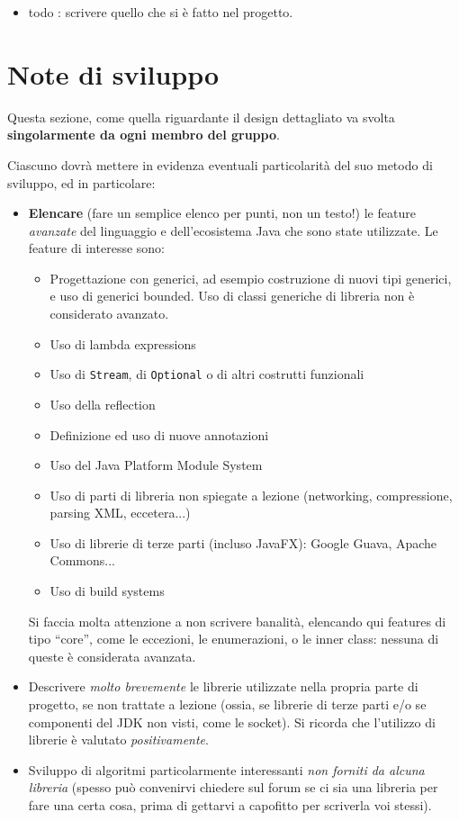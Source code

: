 \begin{itemize}
	\item  todo : scrivere quello che si è fatto nel progetto.
\end{itemize}

\section{Note di sviluppo}

Questa sezione, come quella riguardante il design dettagliato va svolta \textbf{singolarmente da ogni membro del gruppo}.

Ciascuno dovrà mettere in evidenza eventuali particolarità del suo metodo di sviluppo, ed in particolare:
\begin{itemize}
	\item \textbf{Elencare} (fare un semplice elenco per punti, non un testo!) le feature \textit{avanzate} del linguaggio e dell'ecosistema Java che sono state
	utilizzate. Le feature di interesse sono:
	\begin{itemize}
		\item Progettazione con generici, ad esempio costruzione di nuovi tipi generici, e uso di generici bounded. Uso di classi generiche di libreria non è considerato avanzato.
		\item Uso di lambda expressions
		\item Uso di \texttt{Stream}, di \texttt{Optional} o di altri costrutti funzionali
		\item Uso della reflection
		\item Definizione ed uso di nuove annotazioni
		\item Uso del Java Platform Module System
		\item Uso di parti di libreria non spiegate a lezione (networking, compressione, parsing XML, eccetera...)
		\item Uso di librerie di terze parti (incluso JavaFX): Google Guava, Apache Commons...
		\item Uso di build systems
	\end{itemize}
	Si faccia molta attenzione a non scrivere banalità, elencando qui features di tipo ``core'', come le eccezioni, le enumerazioni, o le inner class: nessuna di queste è considerata avanzata.
	\item Descrivere \textit{molto brevemente} le librerie utilizzate nella propria parte di progetto, se non trattate a lezione (ossia, se librerie di terze parti e/o se componenti del JDK non visti, come le socket). Si ricorda che l'utilizzo di librerie è valutato \emph{positivamente}.
	\item Sviluppo di algoritmi particolarmente interessanti \emph{non forniti da alcuna libreria} (spesso può convenirvi chiedere sul forum se ci sia una libreria per fare una certa cosa, prima di gettarvi a capofitto per scriverla voi stessi).
\end{itemize}
